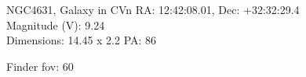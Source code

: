 \begin{block}{NGC4631, Galaxy in CVn}
    RA: 12:42:08.01, Dec: +32:32:29.4 \\ 
    Magnitude (V): 9.24 \\ 
    Dimensions: 14.45 x 2.2 PA: 86 

    Finder fov: 60 
\end{block}